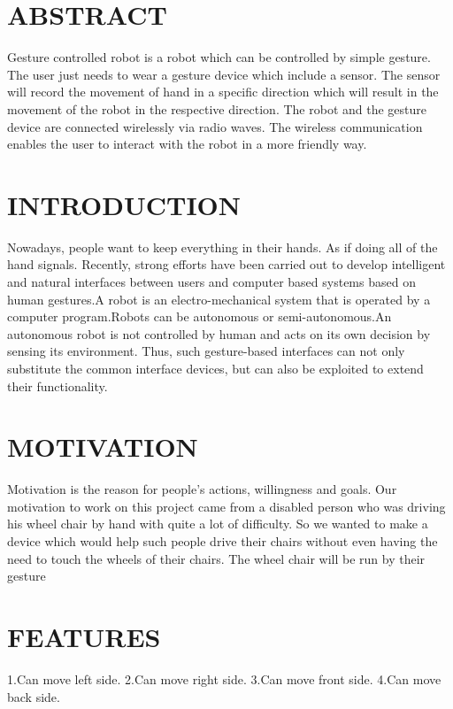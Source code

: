 \documentclass[12pt]{article}
\begin{document}

\tableofcontents
\pagebreak


\section{ABSTRACT}
Gesture controlled robot  is a  robot which can be controlled by simple gesture. The user just needs to wear a gesture device which include a sensor. The sensor will record the movement of hand in a specific direction which will result in the movement of the robot in the respective direction. The robot and the gesture device are connected wirelessly via radio waves. The wireless communication enables the user to interact  with the robot in a more friendly way.

\section{INTRODUCTION}
Nowadays, people want to keep everything in their hands. As if doing all of the hand signals. Recently, strong efforts have been carried out to develop intelligent and natural interfaces between users and computer based systems based on human gestures.A robot is an electro-mechanical system that is operated by a computer program.Robots can be autonomous or semi-autonomous.An autonomous robot is not controlled by human and acts on its own decision by sensing its environment. Thus, such gesture-based interfaces can not only substitute the common interface devices, but can also be exploited to extend their functionality.


\section{MOTIVATION}
Motivation is the reason for people's actions, willingness and goals. Our motivation to work on this project came from a disabled person who was driving his wheel chair by hand with quite a lot of difficulty. So we wanted to make a device which would help such people drive their chairs without even having the need to touch the wheels of their chairs. The wheel chair will be run by their gesture

\section{FEATURES}
1.Can move left  side.\newline
2.Can move right  side.\newline
3.Can move front  side.\newline
4.Can move back  side.
\pagebreak
\end{document}
